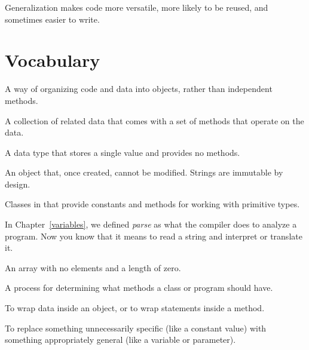 Generalization makes code more versatile, more likely to be reused, and sometimes easier to write.






\section{Vocabulary}

\begin{description}

A way of organizing code and data into objects, rather than independent methods.

A collection of related data that comes with a set of methods that operate on the data.

A data type that stores a single value and provides no methods.

An object that, once created, cannot be modified.
Strings are immutable by design.

Classes in  that provide constants and methods for working with primitive types.

In Chapter~\ref{variables}, we defined {\em parse} as what the compiler does to analyze a program.
Now you know that it means to read a string and interpret or translate it.

An array with no elements and a length of zero.

A process for determining what methods a class or program should have.

To wrap data inside an object, or to wrap statements inside a method.

To replace something unnecessarily specific (like a constant value) with something appropriately general (like a variable or parameter).

\end{description}


